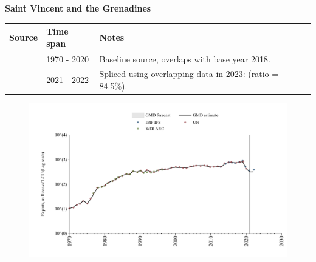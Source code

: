 \documentclass[12pt,a4paper,landscape]{article}
\begin{document}
\begin{adjustbox}{max totalsize={\paperwidth}{\paperheight},center}
\begin{minipage}[t][\textheight][t]{\textwidth}
\vspace*{0.5cm}
{}
\begin{center}
{\Large\bfseries Saint Vincent and the Grenadines}
\end{center}
\vspace{0.5cm}
\begin{table}[H]
\centering
\small
\begin{tabular}{|l|l|l|}
\hline
\textbf{Source} & \textbf{Time span} & \textbf{Notes} \\
\hline
\rowcolor{white}\cite{UN}& 1970 - 2020 &Baseline source, overlaps with base year 2018.\\
\rowcolor{lightgray}\cite{IMF_IFS}& 2021 - 2022 &Spliced using overlapping data in 2023: (ratio = 84.5\%).\\
\hline
\end{tabular}
\end{table}
\begin{figure}[H]
\centering
\includegraphics[width=\textwidth,height=0.6\textheight,keepaspectratio]{graphs/VCT_exports.pdf}
\end{figure}
\end{minipage}
\end{adjustbox}
\end{document}
